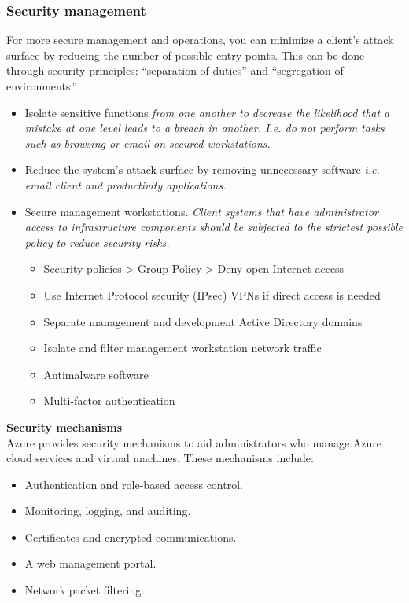 \subsubsection{Security management}
For more secure management and operations, you can minimize a client’s attack surface by reducing the number of possible entry points. This can be done through security principles: “separation of duties” and “segregation of environments.”

\begin{itemize}
\item Isolate sensitive functions \textit{from one another to decrease the likelihood that a mistake at one level leads to a breach in another. I.e. do not perform tasks such as browsing or email on secured workstations.}
\item Reduce the system’s attack surface by removing unnecessary software \textit{i.e. email client and productivity applications.}
\item Secure management workstations. \textit{Client systems that have administrator access to infrastructure components should be subjected to the strictest possible policy to reduce security risks.}
	\begin{itemize}
	\item Security policies > Group Policy > Deny open Internet access
	\item Use Internet Protocol security (IPsec) VPNs if direct access is needed
	\item Separate management and development Active Directory domains
	\item Isolate and filter management workstation network traffic
	\item Antimalware software
	\item Multi-factor authentication 
	\end{itemize}
\end{itemize}

\textbf{Security mechanisms}\\
Azure provides security mechanisms to aid administrators who manage Azure cloud services and virtual machines. These mechanisms include:

\begin{itemize}
\item Authentication and role-based access control.
\item Monitoring, logging, and auditing.
\item Certificates and encrypted communications.
\item A web management portal.
\item Network packet filtering.
\end{itemize}

